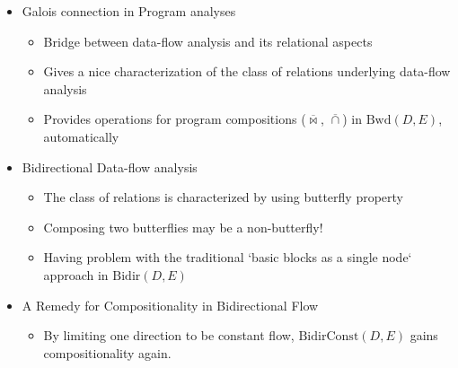 \documentclass{llncs}
\newcommand{\Bidir}{\mathrm{Bidir}}
\newcommand{\Unidir}{\mathrm{Bwd}}
\newcommand{\UnidirConst}{\mathrm{BidirConst}}
\newcommand{\bowtielift}{\mathbin{\overline{\bowtie}}}
\newcommand{\caplift}{\mathbin{\overline{\cap}}}
\begin{document}
\begin{itemize}
    \item Galois connection in Program analyses
    \begin{itemize}
      \item Bridge between data-flow analysis and its relational aspects
      \item Gives a nice characterization of the class of relations underlying data-flow analysis
      \item Provides operations for program compositions ($\bowtielift$, $\caplift$) in $\Unidir(D, E)$, automatically
    \end{itemize}
    \item Bidirectional Data-flow analysis
    \begin{itemize}
      \item The class of relations is characterized by using butterfly property
      \item Composing two butterflies may be a non-butterfly!
      \item Having problem with the traditional `basic blocks as a single node` approach in $\Bidir(D, E)$
    \end{itemize}
    \item A Remedy for Compositionality in Bidirectional Flow
    \begin{itemize}
      \item By limiting one direction to be constant flow, $\UnidirConst(D, E)$ gains compositionality again.
    \end{itemize}
  \end{itemize}



\nocite{*}  %
  

  

\appendix
\end{document}
